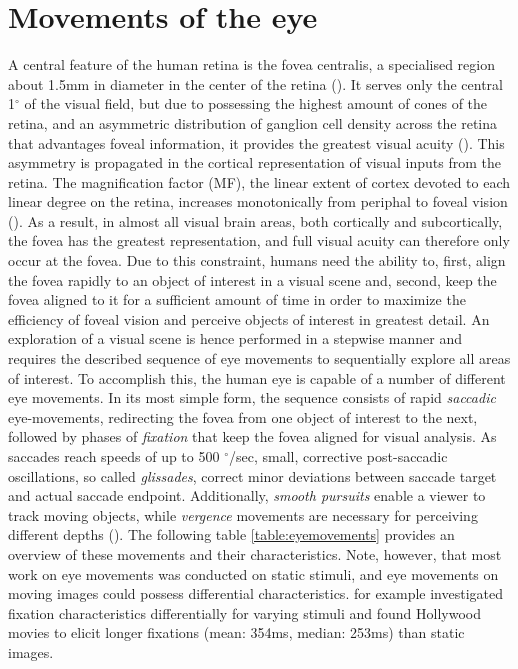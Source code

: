 \documentclass[a4paper, 12pt]{scrreprt}
\begin{document}
\section{Movements of the eye}\label{section:eyemoves}
A central feature of the human retina is the fovea centralis, a specialised region about 1.5mm in diameter in the center of the retina (\cite{benninghof2004anat}). It serves only the central 1$^\circ$ of the visual field, but due to possessing the highest amount of cones of the retina, and an asymmetric distribution of ganglion cell density across the retina that advantages foveal information, it provides the greatest visual acuity (\cite{perry1986ganglion}). This asymmetry is propagated in the cortical representation of visual inputs from the retina. The magnification factor (MF), the linear extent of cortex devoted to each linear degree on the retina, increases monotonically from periphal to foveal vision (\cite{daniel1961representation}). As a result, in almost all visual brain areas, both cortically and subcortically, the fovea has the greatest representation, and full visual acuity can therefore only occur at the fovea. 
Due to this constraint, humans need the ability to, first, align the fovea rapidly to an object of interest in a visual scene and, second, keep the fovea aligned to it for a sufficient amount of time in order to maximize the efficiency of foveal vision and perceive objects of interest in greatest detail. An exploration of a visual scene is hence performed in a stepwise manner and requires the described sequence of eye movements to sequentially explore all areas of interest. To accomplish this, the human eye is capable of a number of different eye movements. In its most simple form, the sequence consists of rapid \textit{saccadic} eye-movements, redirecting the fovea from one object of interest to the next, followed by phases of \textit{fixation} that keep the fovea aligned for visual analysis. As saccades reach speeds of up to 500 $^\circ$/sec, small, corrective post-saccadic oscillations, so called \textit{glissades}, correct minor deviations between saccade target and actual saccade endpoint. Additionally, \textit{smooth pursuits} enable a viewer to track moving objects, while \textit{vergence} movements are necessary for perceiving different depths (\cite{holmqvist2011eye}). The following table \ref{table:eyemovements} provides an overview of these movements and their characteristics. Note, however, that most work on eye movements was conducted on static stimuli, and eye movements on moving images could possess differential characteristics. \textcite{dorr2010variability} for example investigated fixation characteristics differentially for varying stimuli and found Hollywood movies to elicit longer fixations (mean: 354ms, median: 253ms) than static images. \newline
  
\end{document}
